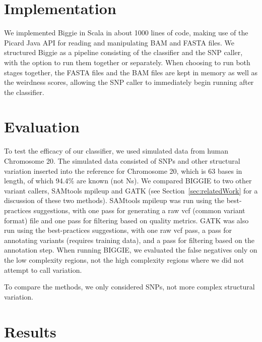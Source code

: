 \documentclass[10pt]{article}
\begin{document}
\section{Implementation}

We implemented Biggie in Scala in about 1000 lines of code, making use of the Picard Java API \cite{picard} for reading and manipulating BAM and FASTA files.
We structured Biggie as a pipeline consisting of the classifier and the SNP caller, with the option to run them together or separately.
When choosing to run both stages together, the FASTA files and the BAM files are kept in memory as well as the weirdness scores, allowing the SNP caller to immediately begin running after the classifier.

\section{Evaluation}

To test the efficacy of our classifier, we used
simulated data \cite{tvsim} from human Chromosome 20. The simulated data consisted of SNPs and other structural variation 
inserted into the reference for Chromosome 20, which is $63$ bases in length,
of which 94.4\% are known (not Ns).
We compared BIGGIE to two other variant callers, SAMtools mpileup and GATK (see Section~\ref{sec:relatedWork} for a discussion of these two methods). SAMtools mpileup was run using the best-practices suggestions, with one pass for generating a raw vcf (common variant format) file and one pass for filtering based on quality metrics. GATK was also run using the best-practices suggestions, with one raw vcf pass, a pass for annotating variants (requires training data), and a pass for filtering based on the annotation step. When running BIGGIE, we evaluated the false negatives only on the low complexity regions, not the high complexity regions where we did not attempt to call variation.

To compare the methods, we only considered SNPs, not more complex structural variation.

\section{Results}
\end{document}
